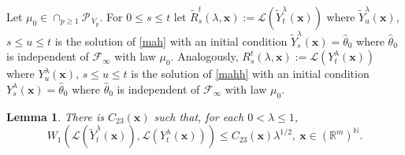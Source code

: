 \documentclass[a4paper,draft]{article}
\newtheorem{lemma}[theorem]{Lemma}
\begin{document}
Let $\mu_0\in\cap_{p\geq 1}\mathcal{P}_{\, V_p}$. For $0\leq s\leq t$ let
$\tilde{R}_s^t(\lambda,\mathbf{x}):=\mathcal{L}(\tilde{Y}_t^{\lambda}(\mathbf{x}))$
where $\tilde{Y}_u^{\lambda}(\mathbf{x})$, $s\leq u\leq t$ is the solution
of \eqref{mah} with an initial condition $\tilde{Y}_s^{\lambda}(\mathbf{x})=\hat{\theta}_0$
where $\hat{\theta}_0$ is independent of $\mathcal{F}_{\infty}$ with law $\mu_0$.
Analogously, ${R}_s^t(\lambda,\mathbf{x}):=\mathcal{L}({Y}_t^{\lambda}(\mathbf{x}))$
where ${Y}_u^{\lambda}(\mathbf{x})$, $s\leq u\leq t$ is the solution
of \eqref{mahh} with an initial condition ${Y}_s^{\lambda}(\mathbf{x})=\hat{\theta}_0$
where $\hat{\theta}_0$ is independent of $\mathcal{F}_{\infty}$ with law $\mu_0$.


\begin{lemma}\label{kl} There is
$C_{23}(\mathbf{x})$ such that, for each $0<\lambda\leq 1$,
$$
W_1(\mathcal{L}(\tilde{Y}^{\lambda}_t(\mathbf{x})),
\mathcal{L}(Y^{\lambda}_t(\mathbf{x})))\leq
C_{23}(\mathbf{x})\lambda^{1/2},\ \mathbf{x}\in(\mathbb{R}^m)^{\mathbb{N}}.
$$
\end{lemma}
\end{document}
